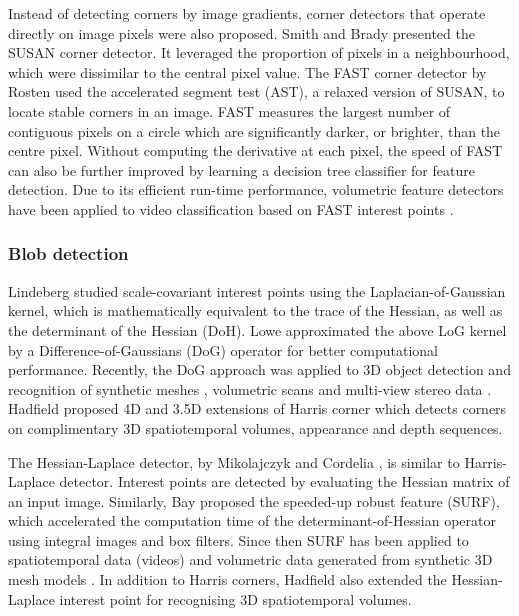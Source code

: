 Instead of detecting corners by image gradients, corner detectors that operate directly on image pixels were also proposed. 
Smith and Brady \cite{Smith1997} presented the SUSAN corner detector. It leveraged the proportion of pixels in a neighbourhood, which were dissimilar to the central pixel value.
The FAST corner detector by Rosten \etal \cite{Rosten2010} used the accelerated segment test (AST), a relaxed version of SUSAN, to locate stable corners in an image.  
FAST measures the largest number of contiguous pixels on a circle which are significantly darker, or brighter, than the centre pixel. Without computing the derivative at each pixel, the speed of FAST can also be further improved by learning a decision tree classifier for feature detection. Due to its efficient run-time performance, volumetric feature detectors have been applied to video classification based on FAST interest points \cite{Koelstra2009,Yu2010}. 

\subsubsection{Blob detection}

Lindeberg \cite{Lindeberg1998} studied scale-covariant interest points using the Laplacian-of-Gaussian kernel, which is mathematically equivalent to the trace of the Hessian, as well as the determinant of the Hessian (DoH). Lowe \cite{Lowe2004} approximated the above LoG kernel by a Difference-of-Gaussians (DoG) operator for better computational performance. Recently, the DoG approach was applied to 3D object detection and recognition of synthetic meshes \cite{Wessel2006}, volumetric scans \cite{Flitton2010} and multi-view stereo data \cite{Pham2011}. Hadfield \etal \cite{Hadfield2013} proposed 4D and 3.5D extensions of Harris corner which detects corners on complimentary 3D spatiotemporal volumes, \ie appearance and depth sequences.

The Hessian-Laplace detector, by Mikolajczyk and Cordelia \cite{Mikolajczyk2004}, is similar to Harris-Laplace detector. Interest points are detected by evaluating the Hessian matrix of an input image. 
Similarly, Bay \etal \cite{Bay2008} proposed the speeded-up robust feature (SURF), which accelerated the computation time of the determinant-of-Hessian operator using integral images and box filters. Since then SURF has been applied to spatiotemporal data (videos) \cite{Willems2008} and volumetric data generated from synthetic 3D mesh models \cite{Knopp2010}. In addition to Harris corners, Hadfield \etal \cite{Hadfield2013} also extended the Hessian-Laplace interest point for recognising 3D spatiotemporal volumes.


